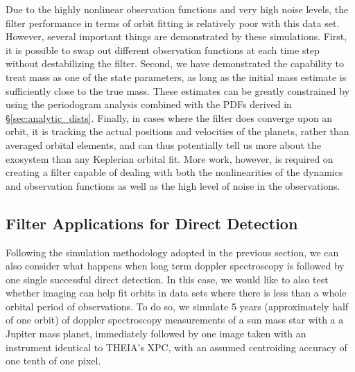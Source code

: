 Due to the highly nonlinear observation functions and very high noise levels, the filter performance in terms of orbit fitting is relatively poor with this data set.  However, several important things are demonstrated by these simulations.  First, it is possible to swap out different observation functions at each time step without destabilizing the filter.  Second, we have demonstrated the capability to treat mass as one of the state parameters, as long as the initial mass estimate is sufficiently close to the true mass.  These estimates can be greatly constrained by using the periodogram analysis combined with the PDFs derived in \S\ref{sec:analytic_dists}. Finally, in cases where the filter does converge upon an orbit, it is tracking the actual positions and velocities of the planets, rather than averaged orbital elements, and can thus potentially tell us more about the exosystem than any Keplerian orbital fit.  More work, however, is required on creating a filter capable of dealing with both the nonlinearities of the dynamics and observation functions as well as the high level of noise in the observations. 

\subsection{Filter Applications for Direct Detection}

Following the simulation methodology adopted in the previous section, we can also consider what happens when long term doppler spectroscopy is  followed by one single successful direct detection.  In this case, we would like to also test whether imaging can help fit orbits in data sets where there is less than a whole orbital period of observations.  To do so, we simulate 5 years (approximately half of one orbit) of doppler spectroscopy measurements of a sun mass star with a a Jupiter mass planet, immediately followed by one image taken with an instrument identical to THEIA's XPC, with an assumed centroiding accuracy of one tenth of one pixel.

